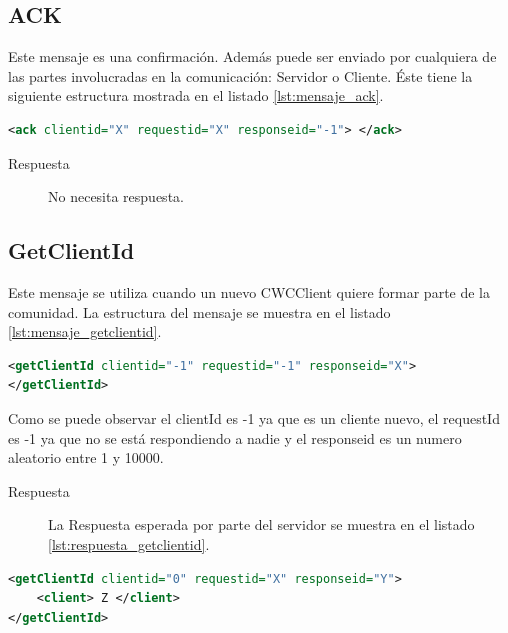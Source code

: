 
\subsection{ACK}

Este mensaje es una confirmación. Además puede ser enviado por cualquiera de las partes involucradas en la comunicación: Servidor o Cliente. Éste tiene la siguiente estructura mostrada en el listado \ref{lst:mensaje_ack}.

\begin{lstlisting}[language=XML,caption={Mensaje ACK},label={lst:mensaje_ack}]
<ack clientid="X" requestid="X" responseid="-1"> </ack>
\end{lstlisting}

\begin{description}
\item[Respuesta] No necesita respuesta.
\end{description}


\subsection{GetClientId}

Este mensaje se utiliza cuando un nuevo CWCClient quiere formar parte de la comunidad. La estructura del mensaje se muestra en el listado \ref{lst:mensaje_getclientid}.

\begin{lstlisting}[language=XML,caption={Mensaje GetClientId},label={lst:mensaje_getclientid}]
<getClientId clientid="-1" requestid="-1" responseid="X"> 
</getClientId>
\end{lstlisting}


Como se puede observar el clientId es -1 ya que es un cliente nuevo, el requestId es -1 ya que no se está respondiendo a nadie y el responseid es un numero aleatorio entre 1 y 10000. 

\begin{description}
\item[Respuesta] La Respuesta esperada por parte del servidor se muestra en el listado \ref{lst:respuesta_getclientid}.
\end{description}

 \begin{lstlisting}[language=XML,caption={Mensaje de Respuesta GetClientId},label={lst:respuesta_getclientid}]
<getClientId clientid="0" requestid="X" responseid="Y"> 
	<client> Z </client>
</getClientId>
\end{lstlisting}

